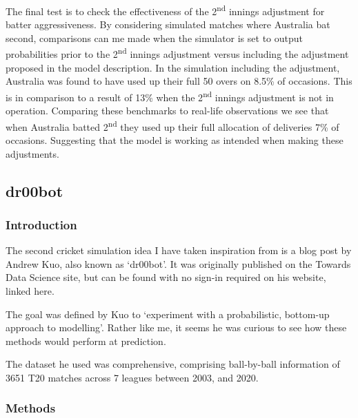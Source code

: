 The final test is to check the effectiveness of the 2\textsuperscript{nd} innings adjustment for batter aggressiveness. By considering simulated matches where Australia bat second, comparisons can me made when the simulator is set to output probabilities prior to the 2\textsuperscript{nd} innings adjustment versus including the adjustment proposed in the model description. In the simulation including the adjustment, Australia was found to have used up their full 50 overs on 8.5\% of occasions. This is in comparison to a result of 13\% when the 2\textsuperscript{nd} innings adjustment is not in operation. Comparing these benchmarks to real-life observations we see that when Australia batted 2\textsuperscript{nd} they used up their full allocation of deliveries 7\% of occasions. Suggesting that the model is working as intended when making these adjustments.

\subsection{dr00bot}

\subsubsection{Introduction}

The second cricket simulation idea I have taken inspiration from is a blog post by Andrew Kuo, also known as ‘dr00bot’. It was originally published on the Towards Data Science site, but can be found with no sign-in required on his website, linked here. \cite{kuo_predicting_2021}

The goal was defined by Kuo to ‘experiment with a probabilistic, bottom-up approach to modelling’. Rather like me, it seems he was curious to see how these methods would perform at prediction.

The dataset he used was comprehensive, comprising ball-by-ball information of 3651 T20 matches across 7 leagues between 2003, and 2020.

\subsubsection{Methods}

